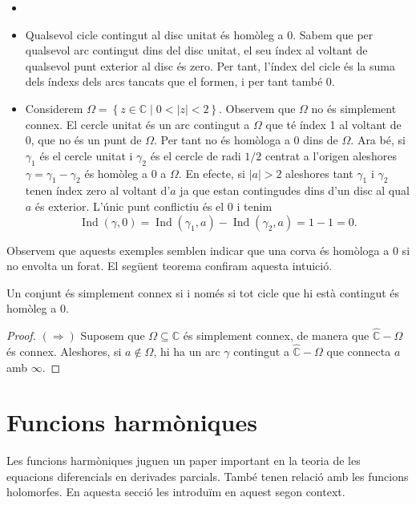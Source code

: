 \documentclass[12pt,twoside]{report}
\numberwithin{table}{section}
\numberwithin{equation}{section}
\numberwithin{figure}{section}
\newcommand{\C}{\ensuremath{\mathbb{C}}}
\newcommand{\Ci}{\ensuremath{\hat{\mathbb{C}}}}
\newcommand{\set}[2]{\left\{ #1 \mid #2 \right\}}
\newcommand{\abs}[1]{\left\lvert #1 \right\rvert}
\DeclareMathOperator{\Ind}{Ind}
\begin{document}
\begin{exe}
	\begin{itemize}
		\item[]
		\item Qualsevol cicle contingut al disc unitat és homòleg a 0. Sabem que per qualsevol arc contingut dins del disc unitat, el seu índex al voltant de qualsevol punt exterior al disc és zero. Per tant, l'índex del cicle és la suma dels índexs dels arcs tancats que el formen, i per tant també 0. 
		\item Considerem \( \Omega = \set{z \in \C}{0 < \abs{z} < 2} \). Observem que \( \Omega \) no és simplement connex. El cercle unitat és un arc contingut a \( \Omega \) que té índex 1 al voltant de 0, que no és un punt de \( \Omega \). Per tant no és homòloga a 0 dins de \( \Omega \).
			Ara bé, si \( \gamma_1 \) és el cercle unitat i \( \gamma_2 \) és el cercle de radi \( 1/2 \) centrat a l'origen aleshores \( \gamma = \gamma_1 - \gamma_2 \) és homòleg a 0 a \( \Omega \). En efecte, si \( \abs{a} > 2 \) aleshores tant \( \gamma_1 \) i \( \gamma_2 \) tenen índex zero al voltant d'\( a \) ja que estan contingudes dins d'un disc al qual \( a \) és exterior. L'únic punt conflictiu és el 0 i tenim
			\begin{equation*}
				\Ind(\gamma, 0) = \Ind(\gamma_1, a) - \Ind(\gamma_2, a) = 1 - 1 = 0.
			\end{equation*}
	\end{itemize}
\end{exe}

Observem que aquests exemples semblen indicar que una corva és homòloga a 0 si no envolta un forat. El següent teorema confiram aquesta intuició.
\begin{teo}
	Un conjunt és simplement connex si i només si tot cicle que hi està contingut és homòleg a 0.
\end{teo}
\begin{proof}
	\( (\Rightarrow) \) Suposem que \( \Omega \subseteq \C \) és simplement connex, de manera que \( \Ci - \Omega \) és connex. Aleshores, si \( a \notin \Omega \), hi ha un arc \( \gamma \) contingut a \( \Ci - \Omega \) que connecta \( a \) amb \( \infty \).
\end{proof}

\section{Funcions harmòniques}
Les funcions harmòniques juguen un paper important en la teoria de les equacions diferencials en derivades parcials. També tenen relació amb les funcions holomorfes. En aquesta secció les introduïm en aquest segon context. 
\end{document}
